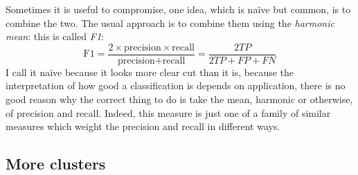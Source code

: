 \documentclass[12pt]{article}
\begin{document}
Sometimes it is useful to compromise, one idea, which is na\"ive but
common, is to combine the two. The usual approach is to combine them using the \textsl{harmonic mean}: this is called \textsl{F1}:
\begin{equation}
  \mbox{F1}=\frac{2\times\mbox{precision}\times\mbox{recall}}{\mbox{precision}+\mbox{recall}}=\frac{2TP}{2TP+FP+FN}
\end{equation}
I call it na\"ive because it looks more clear cut than it is, because
the interpretation of how good a classification is depends on
application, there is no good reason why the correct thing to do is
take the mean, harmonic or otherwise, of precision and recall. Indeed,
this measure is just one of a family of similar measures which weight
the precision and recall in different ways.

\subsection*{More clusters}
\end{document}
